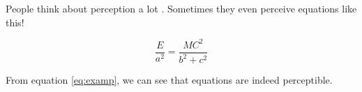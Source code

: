 
People think about perception a lot \citep{Wertheimer:1923}.
Sometimes they even perceive equations like this!

\begin{equation}
  \frac {E}{a^2} = \frac {MC^2}{b^2 + c^2}
  \label{eq:examp}
\end{equation}

From equation \eqref{eq:examp}, we can see that equations are indeed perceptible.

